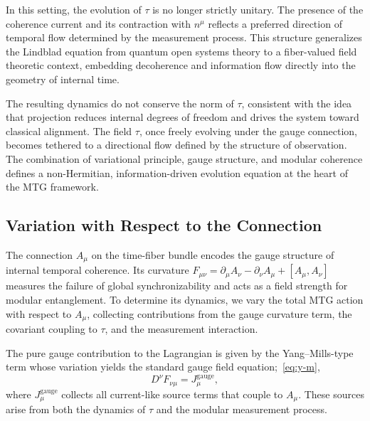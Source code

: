 \documentclass[11pt]{article}
\begin{document}
In this setting, the evolution of \( \tau \) is no longer strictly unitary. The presence of the coherence current and its contraction with \( n^\mu \) reflects a preferred direction of temporal flow determined by the measurement process. This structure generalizes the Lindblad equation from quantum open systems theory to a fiber-valued field theoretic context, embedding decoherence and information flow directly into the geometry of internal time.

The resulting dynamics do not conserve the norm of \( \tau \), consistent with the idea that projection reduces internal degrees of freedom and drives the system toward classical alignment. The field \( \tau \), once freely evolving under the gauge connection, becomes tethered to a directional flow defined by the structure of observation. The combination of variational principle, gauge structure, and modular coherence defines a non-Hermitian, information-driven evolution equation at the heart of the MTG framework.
\subsection{Variation with Respect to the Connection}

The connection \( A_\mu \) on the time-fiber bundle encodes the gauge structure of internal temporal coherence. Its curvature \( F_{\mu\nu} = \partial_\mu A_\nu - \partial_\nu A_\mu + [A_\mu, A_\nu] \) measures the failure of global synchronizability and acts as a field strength for modular entanglement. To determine its dynamics, we vary the total MTG action with respect to \( A_\mu \), collecting contributions from the gauge curvature term, the covariant coupling to \( \tau \), and the measurement interaction.

The pure gauge contribution to the Lagrangian is given by the Yang--Mills-type term whose variation yields the standard gauge field equation;~\eqref{eq:y-m}, 
\begin{equation}
D^\nu F_{\nu\mu} = J^{\mathrm{gauge}}_\mu,
\end{equation}
where \( J^{\mathrm{gauge}}_\mu \) collects all current-like source terms that couple to \( A_\mu \). These sources arise from both the dynamics of \( \tau \) and the modular measurement process.
\end{document}
